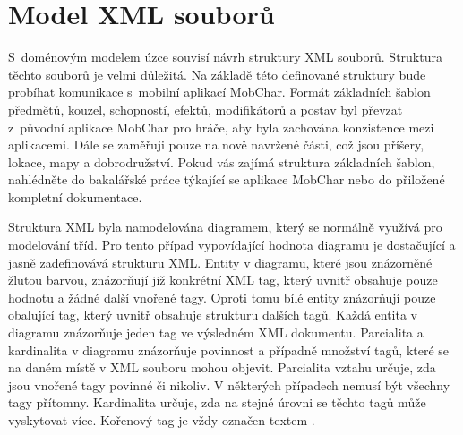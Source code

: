 \documentclass[thesis=B,czech]{resources/FITthesis}[2012/06/26]
\begin{document}
	\section{Model XML souborů}
S~doménovým modelem úzce souvisí návrh struktury XML souborů. Struktura těchto souborů je velmi důležitá. Na základě této definované struktury bude probíhat komunikace s~mobilní aplikací MobChar. Formát základních šablon předmětů, kouzel, schopností, efektů, modifikátorů a postav byl převzat z~původní aplikace MobChar pro hráče, aby byla zachována konzistence mezi aplikacemi. Dále se zaměřuji pouze na nově navržené části, což jsou příšery, lokace, mapy a dobrodružství. Pokud vás zajímá struktura základních šablon, nahlédněte do bakalářské práce týkající se aplikace MobChar\cite{Weberova_2017} nebo do přiložené kompletní dokumentace.\par

Struktura XML byla namodelována diagramem, který se normálně využívá pro modelování tříd. Pro tento případ vypovídající hodnota diagramu je dostačující a jasně zadefinovává strukturu XML. Entity v diagramu, které jsou znázorněné žlutou barvou, znázorňují již konkrétní XML tag, který uvnitř obsahuje pouze hodnotu a žádné další vnořené tagy. Oproti tomu bílé entity znázorňují pouze obalující tag, který uvnitř obsahuje strukturu dalších tagů. Každá entita v diagramu znázorňuje jeden tag ve výsledném XML dokumentu. Parcialita a kardinalita v diagramu znázorňuje povinnost a případně množství tagů, které se na daném místě v XML souboru mohou objevit. Parcialita vztahu určuje, zda jsou vnořené tagy povinné či nikoliv. V některých případech nemusí být všechny tagy přítomny. Kardinalita určuje, zda na stejné úrovni se těchto tagů může vyskytovat více. Kořenový tag je vždy označen textem   .
\end{document}
